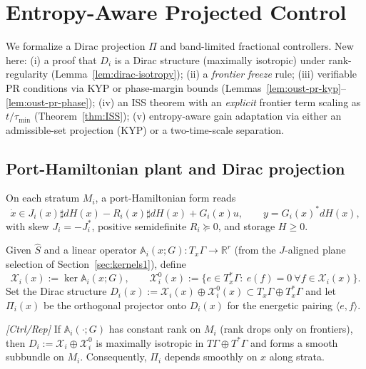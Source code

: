 \section{Entropy-Aware Projected Control}\label{sec:control1}

We formalize a Dirac projection $\Pi$ and band-limited fractional controllers. New here: 
(i) a proof that $D_i$ is a Dirac structure (maximally isotropic) under rank-regularity (Lemma~\ref{lem:dirac-isotropy}); 
(ii) a \emph{frontier freeze} rule; 
(iii) verifiable PR conditions via KYP or phase-margin bounds (Lemmas~\ref{lem:oust-pr-kyp}--\ref{lem:oust-pr-phase}); 
(iv) an ISS theorem with an \emph{explicit} frontier term scaling as $t/\tau_{\min}$ (Theorem~\ref{thm:ISS}); 
(v) entropy-aware gain adaptation via either an admissible-set projection (KYP) or a two-time-scale separation.

\setcounter{definition}{5}
\setcounter{lemma}{6}
\setcounter{theorem}{2}

\subsection{Port-Hamiltonian plant and Dirac projection}

On each stratum $M_i$, a port-Hamiltonian form reads
\[
\dot x \in J_i(x)\sharp dH(x) - R_i(x)\sharp dH(x) + G_i(x)u,\qquad y=G_i(x)^{\!*} dH(x),
\]
with skew $J_i=-J_i^{\!*}$, positive semidefinite $R_i\succeq 0$, and storage $H\ge 0$. 

\begin{definition}\label{def:dirac-proj}
Given $\hat S$ and a linear operator $\mathbb A_i(x;G):T_x\Gamma\to \mathbb R^r$ (from the $J$-aligned plane selection of Section~\ref{sec:kernels1}), define
\[
\mathcal X_i(x):=\ker \mathbb A_i(x;G),\qquad \mathcal X_i^0(x):=\{e\in T_x^*\Gamma:\ e(f)=0\ \forall f\in \mathcal X_i(x)\}.
\]
Set the Dirac structure $D_i(x):=\mathcal X_i(x)\oplus \mathcal X_i^0(x)\subset T_x\Gamma\oplus T_x^*\Gamma$ and let $\Pi_i(x)$ be the orthogonal projector onto $D_i(x)$ for the energetic pairing $\langle e,f\rangle$.
\end{definition}

\begin{lemma}\label{lem:dirac-isotropy}
\emph{[\textup{Ctrl/Rep}]} If $\mathbb A_i(\cdot;G)$ has constant rank on $M_i$ (rank drops only on frontiers), then $D_i:=\mathcal X_i\oplus \mathcal X_i^0$ is maximally isotropic in $T\Gamma\oplus T^*\Gamma$ and forms a smooth subbundle on $M_i$. Consequently, $\Pi_i$ depends smoothly on $x$ along strata.
\end{lemma}

